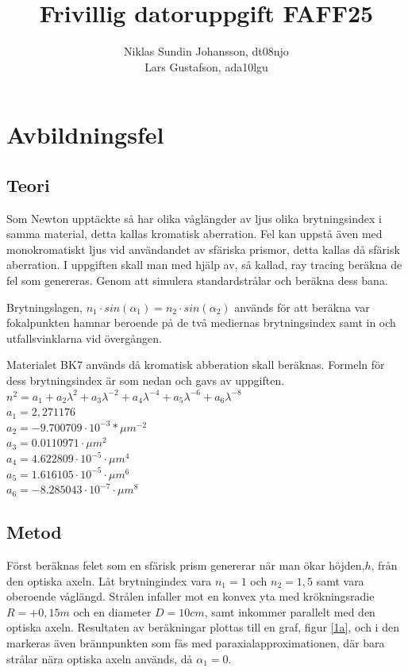 \documentclass[12pt]{article}
\title{Frivillig datoruppgift FAFF25}
\author{Niklas Sundin Johansson, dt08njo\\Lars Gustafson, ada10lgu }
\begin{document}
\maketitle

\section{Avbildningsfel}

\subsection{Teori}
Som Newton upptäckte så har olika våglängder av ljus olika brytningsindex i samma material, detta kallas kromatisk aberration. Fel kan uppstå även med monokromatiskt ljus vid användandet av sfäriska prismor, detta kallas då sfärisk aberration. I uppgiften skall man med hjälp av, så kallad, ray tracing beräkna de fel som genereras. Genom att simulera standardstrålar och beräkna dess bana.  

Brytningslagen, $n_1 \cdot sin(\alpha _1) = n_2 \cdot sin(\alpha _2) $ används för att beräkna var fokalpunkten hamnar beroende på de två mediernas brytningsindex samt in och utfallsvinklarna vid övergången. 

Materialet BK7 används då kromatisk abberation skall beräknas. Formeln för dess brytningsindex är som nedan och gavs av uppgiften.\\
$n^2 = a_1 + a_2 \lambda^2 + a_3 \lambda^{-2}+a_4 \lambda^{-4}+a_5 \lambda^{-6}+a_6\lambda^{-8}$\\
$a_1= 2,271176$\\
$a_2 = -9.700709 \cdot 10^{-3}*\mu m^{-2}$\\
$a_3 = 0.0110971 \cdot \mu m^2$\\
$a_4 = 4.622809 \cdot 10^{-5} \cdot \mu m^4$\\
$a_5 = 1.616105 \cdot 10^{-5} \cdot \mu m^6$\\
$a_6 = -8.285043 \cdot 10^{-7} \cdot \mu m^8$

\subsection{Metod}
Först beräknas felet som en sfärisk prism genererar när man ökar höjden,$h$, från den optiska axeln. Låt brytningindex vara $n_1 = 1$ och $n_2 = 1,5$ samt vara oberoende våglängd. Strålen infaller mot en konvex yta med krökningsradie $R = +0,15m$ och en diameter $D = 10cm$, samt inkommer parallelt med den optiska axeln. 
Resultaten av beräkningar plottas till en graf, figur \ref{1a}, och i den markeras även brännpunkten som fås med paraxialapproximationen, där bara strålar nära optiska axeln används, då $\alpha_1 = 0$.
\end{document}
